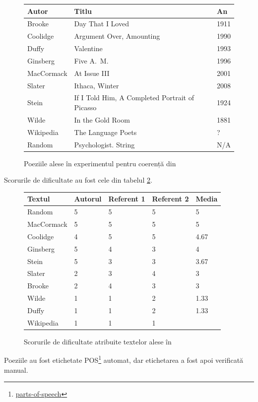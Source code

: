 \begin{figure}[!htb]
  \centering
  \begin{tabular}{l|l|l}
    Autor & Titlu & An \\
    \hline
    Brooke & Day That I Loved & 1911 \\
    Coolidge & Argument Over, Amounting & 1990 \\
    Duffy & Valentine & 1993 \\
    Ginsberg & Five A.\ M.\ & 1996 \\
    MacCormack & At Issue III & 2001 \\
    Slater & Ithaca, Winter & 2008 \\
    Stein & If I Told Him, \newline A Completed Portrait of Picasso & 1924 \\
    Wilde & In the Gold Room & 1881 \\
    Wikipedia & The Language Poets & ? \\
    Random & Psychologist. String & N/A
  \end{tabular}
  \caption{Poeziile alese în experimentul pentru coerență din \cite{herbelot}}
  \label{fig:tab-poezii}
\end{figure}

Scorurile de dificultate au fost cele din tabelul \ref{fig:dif}.

\begin{figure}[!htb]
  \centering
  \begin{tabular}{l|l|l|l|l}
    Textul & Autorul & Referent 1 & Referent 2 & Media \\
    \hline
    Random & 5 & 5 & 5 & 5 \\
    MacCormack & 5 & 5 & 5 & 5 \\
    Coolidge & 4 & 5 & 5 & 4.67 \\
    Ginsberg & 5 & 4 & 3 & 4 \\
    Stein & 5 & 3 & 3 & 3.67 \\
    Slater & 2 & 3 & 4 & 3 \\
    Brooke & 2 & 4 & 3 & 3 \\
    Wilde & 1 & 1 & 2 & 1.33 \\
    Duffy & 1 & 1 & 2 & 1.33 \\
    Wikipedia & 1 & 1 & 1 
  \end{tabular}
  \caption{Scorurile de dificultate atribuite textelor alese în \cite{herbelot}}
  \label{fig:dif}
\end{figure}

Poeziile au fost etichetate POS\footnote{\href{https://en.wikipedia.org/wiki/Part-of-speech\_tagging}{parts-of-speech}}
automat, dar etichetarea a fost apoi verificată manual.


